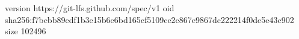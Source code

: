 version https://git-lfs.github.com/spec/v1
oid sha256:f7bcbb89edf1b3e15b6e6bd165cf5109ce2c867e9867dc222214f0de5e43c902
size 102496
